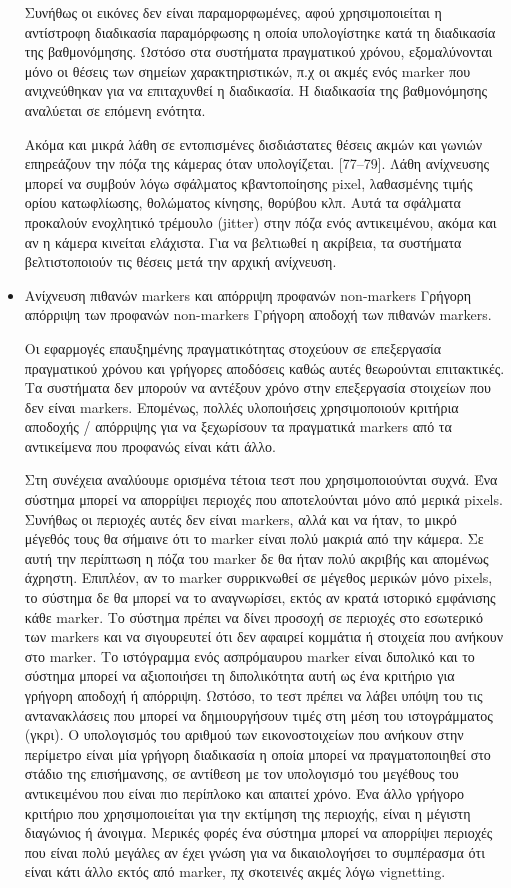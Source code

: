 \begin{itemize}
Συνήθως οι εικόνες δεν είναι παραμορφωμένες, αφού χρησιμοποιείται η αντίστροφη διαδικασία παραμόρφωσης η οποία υπολογίστηκε κατά τη διαδικασία της βαθμονόμησης. Ωστόσο στα συστήματα πραγματικού χρόνου, εξομαλύνονται μόνο οι θέσεις των σημείων χαρακτηριστικών, π.χ οι ακμές ενός marker που ανιχνεύθηκαν για να επιταχυνθεί η διαδικασία. Η διαδικασία της βαθμονόμησης αναλύεται σε επόμενη ενότητα.

Ακόμα και μικρά λάθη σε εντοπισμένες δισδιάστατες θέσεις ακμών και γωνιών επηρεάζουν την πόζα της κάμερας όταν υπολογίζεται. [77–79]. Λάθη ανίχνευσης μπορεί να συμβούν λόγω σφάλματος κβαντοποίησης pixel, λαθασμένης τιμής ορίου κατωφλίωσης, θολώματος κίνησης, θορύβου κλπ. Αυτά τα σφάλματα προκαλούν ενοχλητικό τρέμουλο (jitter) στην πόζα ενός αντικειμένου, ακόμα και αν η κάμερα κινείται ελάχιστα. 
Για να βελτιωθεί η ακρίβεια, τα συστήματα βελτιστοποιούν τις θέσεις μετά την αρχική ανίχνευση.


\item Ανίχνευση πιθανών markers και απόρριψη προφανών non-markers 
Γρήγορη απόρριψη των προφανών non-markers
Γρήγορη αποδοχή των πιθανών markers.

Οι εφαρμογές επαυξημένης πραγματικότητας στοχεύουν σε επεξεργασία πραγματικού χρόνου και γρήγορες αποδόσεις καθώς αυτές θεωρούνται επιτακτικές. Τα συστήματα δεν μπορούν να αντέξουν χρόνο στην επεξεργασία στοιχείων που δεν είναι markers. 
Επομένως, πολλές υλοποιήσεις χρησιμοποιούν κριτήρια αποδοχής / απόρριψης για να ξεχωρίσουν τα πραγματικά markers από τα αντικείμενα που προφανώς είναι κάτι άλλο.

Στη συνέχεια αναλύουμε ορισμένα τέτοια τεστ που χρησιμοποιούνται συχνά.
Ένα σύστημα μπορεί να απορρίψει περιοχές που αποτελούνται μόνο από μερικά pixels. Συνήθως οι περιοχές αυτές δεν είναι markers, αλλά και να ήταν, το μικρό μέγεθός τους θα σήμαινε ότι το marker είναι πολύ μακριά από την κάμερα. Σε αυτή την περίπτωση η πόζα του marker δε θα ήταν πολύ ακριβής και απομένως άχρηστη. Επιπλέον, αν το marker συρρικνωθεί σε μέγεθος μερικών μόνο pixels, το σύστημα δε θα μπορεί να το αναγνωρίσει, εκτός αν κρατά ιστορικό εμφάνισης κάθε marker.
Το σύστημα πρέπει να δίνει προσοχή σε περιοχές στο εσωτερικό των markers και να σιγουρευτεί ότι δεν αφαιρεί κομμάτια ή στοιχεία που ανήκουν στο marker. Το ιστόγραμμα ενός ασπρόμαυρου marker είναι διπολικό και το σύστημα μπορεί να αξιοποιήσει τη διπολικότητα αυτή ως ένα κριτήριο για γρήγορη αποδοχή ή απόρριψη. Ωστόσο, το τεστ πρέπει να λάβει υπόψη του τις αντανακλάσεις που μπορεί να δημιουργήσουν τιμές στη μέση του ιστογράμματος (γκρι). Ο υπολογισμός του αριθμού των εικονοστοιχείων που ανήκουν στην περίμετρο είναι μία γρήγορη διαδικασία η οποία μπορεί να πραγματοποιηθεί στο στάδιο της επισήμανσης, σε αντίθεση με τον υπολογισμό του μεγέθους του αντικειμένου που είναι πιο περίπλοκο και απαιτεί χρόνο. Ένα άλλο γρήγορο κριτήριο που χρησιμοποιείται για την εκτίμηση της περιοχής, είναι η μέγιστη διαγώνιος ή άνοιγμα. Μερικές φορές ένα σύστημα μπορεί να απορρίψει περιοχές που είναι πολύ μεγάλες αν έχει γνώση για να δικαιολογήσει το συμπέρασμα ότι είναι κάτι άλλο εκτός από marker, πχ σκοτεινές ακμές λόγω vignetting.


\end{itemize}
